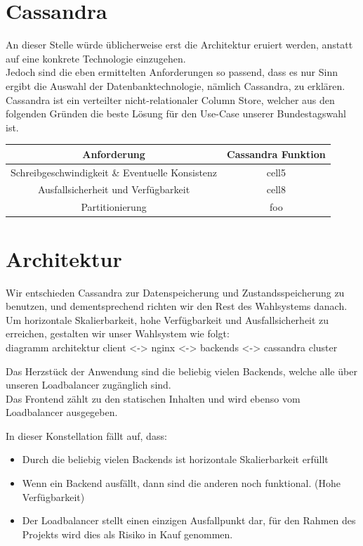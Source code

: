 \documentclass{article}  %
\begin{document}
\newpage
\section{Cassandra}
An dieser Stelle würde üblicherweise erst die Architektur eruiert werden, anstatt auf eine konkrete Technologie einzugehen. \\
Jedoch sind die eben ermittelten Anforderungen so passend, dass es nur Sinn ergibt die Auswahl der Datenbanktechnologie, nämlich Cassandra, zu erklären.\\

Cassandra ist ein verteilter nicht-relationaler Column Store, welcher aus den folgenden Gründen die beste Lösung für den Use-Case unserer Bundestagswahl ist.

    \begin{tabular}{ c | c }
        Anforderung & Cassandra Funktion\\ 
        \hline
     Schreibgeschwindigkeit \& Eventuelle Konsistenz& cell5  \\  
      Ausfallsicherheit und Verfügbarkeit& cell8 \\
      Partitionierung & foo \\   
    \end{tabular}
\newpage
\section{Architektur}
Wir entschieden Cassandra zur Datenspeicherung und Zustandsspeicherung zu benutzen, und dementsprechend richten wir den Rest des Wahlsystems danach. \\
Um horizontale Skalierbarkeit, hohe Verfügbarkeit und Ausfallsicherheit zu erreichen, gestalten wir unser Wahlsystem wie folgt: \\

diagramm architektur
client <-> nginx <-> backends <-> cassandra cluster

Das Herzstück der Anwendung sind die beliebig vielen Backends, welche alle über unseren Loadbalancer zugänglich sind. \\
Das Frontend zählt zu den statischen Inhalten und wird ebenso vom Loadbalancer ausgegeben.

In dieser Konstellation fällt auf, dass: \\
\begin{itemize}
    \item Durch die beliebig vielen Backends ist horizontale Skalierbarkeit erfüllt
    \item Wenn ein Backend ausfällt, dann sind die anderen noch funktional. (Hohe Verfügbarkeit)
    \item Der Loadbalancer stellt einen einzigen Ausfallpunkt dar, für den Rahmen des Projekts wird dies als Risiko in Kauf genommen.
\end{itemize}
\end{document}
